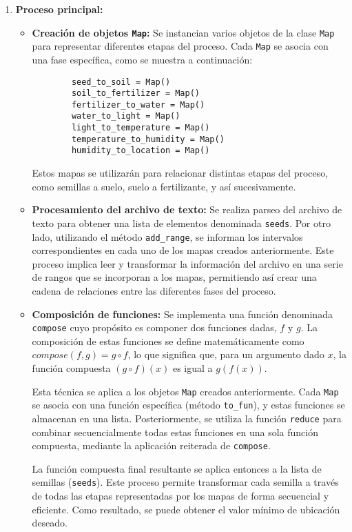 \documentclass[a4paper,12pt]{article}
\begin{document}
\begin{enumerate}
    \item \textbf{Proceso principal:}
    \begin{itemize}
        \item \textbf{Creación de objetos \lstinline{Map}:}
        Se instancian varios objetos de la clase \lstinline{Map} para representar diferentes etapas del proceso. Cada \lstinline{Map} se asocia con una fase específica, como se muestra a continuación:
        \begin{lstlisting}
        seed_to_soil = Map()
        soil_to_fertilizer = Map()
        fertilizer_to_water = Map()
        water_to_light = Map()
        light_to_temperature = Map()
        temperature_to_humidity = Map()
        humidity_to_location = Map()
        \end{lstlisting}
        Estos mapas se utilizarán para relacionar distintas etapas del proceso, como semillas a suelo, suelo a fertilizante, y así sucesivamente.
    
        \item \textbf{Procesamiento del archivo de texto:}
        Se realiza parseo del archivo de texto para obtener una lista de elementos denominada \lstinline{seeds}. Por otro lado, utilizando el método \lstinline{add_range}, se informan los intervalos correspondientes en cada uno de los mapas creados anteriormente. Este proceso implica leer y transformar la información del archivo en una serie de rangos que se incorporan a los mapas, permitiendo así crear una cadena de relaciones entre las diferentes fases del proceso.

        \item \textbf{Composición de funciones:}
        Se implementa una función denominada \lstinline{compose} cuyo propósito es componer dos funciones dadas, $f$ y $g$. La composición de estas funciones se define matemáticamente como $compose(f, g) = g \circ f$, lo que significa que, para un argumento dado $x$, la función compuesta $(g \circ f)(x)$ es igual a $g(f(x))$.
    
        Esta técnica se aplica a los objetos \lstinline{Map} creados anteriormente. Cada \lstinline{Map} se asocia con una función específica (método \lstinline{to_fun}), y estas funciones se almacenan en una lista. Posteriormente, se utiliza la función \lstinline{reduce} para combinar secuencialmente todas estas funciones en una sola función compuesta, mediante la aplicación reiterada de \lstinline{compose}.
    
        La función compuesta final resultante se aplica entonces a la lista de semillas (\lstinline{seeds}). Este proceso permite transformar cada semilla a través de todas las etapas representadas por los mapas de forma secuencial y eficiente. Como resultado, se puede obtener el valor mínimo de ubicación deseado.
        
        
    \end{itemize}
        
\end{enumerate}
\end{document}

